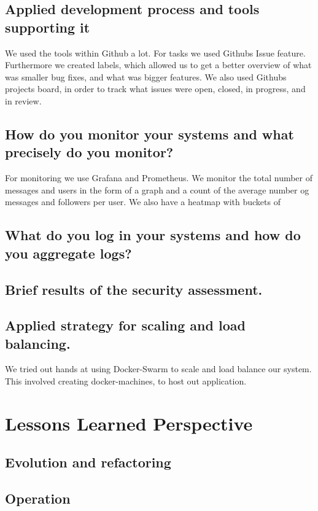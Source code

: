 \documentclass{article}
\begin{document}
\subsection{Applied development process and tools supporting it}
We used the tools within Github a lot. For tasks we used Githubs Issue feature. Furthermore we created labels, which allowed us to get a better overview of what was smaller bug fixes, and what was bigger features. We also used Githubs projects board, in order to track what issues were open, closed, in progress, and in review.

\subsection{How do you monitor your systems and what precisely do you monitor?}
For monitoring we use Grafana and Prometheus. We monitor the total number of messages and users in the form of a graph and a count of the average number og messages and followers per user. We also have a heatmap with buckets of 

\subsection{What do you log in your systems and how do you aggregate logs?}

\subsection{Brief results of the security assessment.}

\subsection{Applied strategy for scaling and load balancing.}
We tried out hands at using Docker-Swarm to scale and load balance our system. This involved creating docker-machines, to host out application. 

\section{Lessons Learned Perspective}
\subsection{Evolution and refactoring}
\subsection{Operation}
\end{document}
